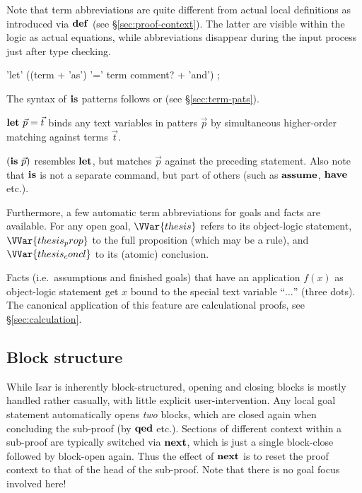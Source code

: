 Note that term abbreviations are quite different from actual local definitions
as introduced via ${\mathord{\mathbf{def}}}$ (see \S\ref{sec:proof-context}).  The latter are
visible within the logic as actual equations, while abbreviations disappear
during the input process just after type checking.

\begin{rail}
  'let' ((term + 'as') '=' term comment? + 'and')
  ;  
\end{rail}

The syntax of ${\mathord{\mathbf{is}}}$ patterns follows  or
 (see \S\ref{sec:term-pats}).

\begin{descr}
\item [${\mathord{\mathbf{let}}}~\vec p = \vec t$] binds any text variables in patters $\vec p$
  by simultaneous higher-order matching against terms $\vec t$.
\item [$({\mathord{\mathbf{is}}}~\vec p)$] resembles ${\mathord{\mathbf{let}}}$, but matches $\vec p$ against the
  preceding statement.  Also note that ${\mathord{\mathbf{is}}}$ is not a separate command,
  but part of others (such as ${\mathord{\mathbf{assume}}}$, ${\mathord{\mathbf{have}}}$ etc.).
\end{descr}

Furthermore, a few automatic term abbreviations
for goals and facts are available.  For any open goal, $\VVar{thesis}$ refers
to its object-logic statement, $\VVar{thesis_prop}$ to the full proposition
(which may be a rule), and $\VVar{thesis_concl}$ to its (atomic) conclusion.

Facts (i.e.\ assumptions and finished goals) that have an application $f(x)$
as object-logic statement get $x$ bound to the special text variable
``$\dots$'' (three dots).  The canonical application of this feature are
calculational proofs, see \S\ref{sec:calculation}.


\subsection{Block structure}

While Isar is inherently block-structured, opening and closing blocks is
mostly handled rather casually, with little explicit user-intervention.  Any
local goal statement automatically opens \emph{two} blocks, which are closed
again when concluding the sub-proof (by ${\mathord{\mathbf{qed}}}$ etc.).  Sections of
different context within a sub-proof are typically switched via
${\mathord{\mathbf{next}}}$, which is just a single block-close followed by
block-open again.  Thus the effect of ${\mathord{\mathbf{next}}}$ is to reset the
proof context to that of the head of the sub-proof.  Note that there is no
goal focus involved here!

